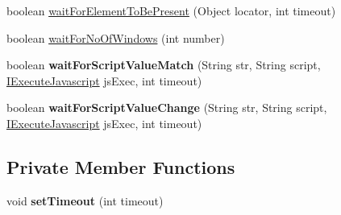 \begin{DoxyCompactItemize}
\item 
boolean \hyperlink{classcom_1_1zeuslearning_1_1automation_1_1selenium_1_1interactions_1_1FluentTimeout_afce3a66e8c4bab59f37be96fd45eeec3}{wait\+For\+Element\+To\+Be\+Present} (Object locator, int timeout)
\item 
boolean \hyperlink{classcom_1_1zeuslearning_1_1automation_1_1selenium_1_1interactions_1_1FluentTimeout_a9d12d8da29ae600e1955e244a79f2ec0}{wait\+For\+No\+Of\+Windows} (int number)
\item 
\hypertarget{classcom_1_1zeuslearning_1_1automation_1_1selenium_1_1interactions_1_1FluentTimeout_ac99f8a5abae929e954664469b8ebdc2d}{}\label{classcom_1_1zeuslearning_1_1automation_1_1selenium_1_1interactions_1_1FluentTimeout_ac99f8a5abae929e954664469b8ebdc2d} 
boolean {\bfseries wait\+For\+Script\+Value\+Match} (String str, String script, \hyperlink{interfacecom_1_1zeuslearning_1_1automation_1_1interactions_1_1IExecuteJavascript}{I\+Execute\+Javascript} js\+Exec, int timeout)
\item 
\hypertarget{classcom_1_1zeuslearning_1_1automation_1_1selenium_1_1interactions_1_1FluentTimeout_ad0e3b0ba98564780c3f3ba0559818e46}{}\label{classcom_1_1zeuslearning_1_1automation_1_1selenium_1_1interactions_1_1FluentTimeout_ad0e3b0ba98564780c3f3ba0559818e46} 
boolean {\bfseries wait\+For\+Script\+Value\+Change} (String str, String script, \hyperlink{interfacecom_1_1zeuslearning_1_1automation_1_1interactions_1_1IExecuteJavascript}{I\+Execute\+Javascript} js\+Exec, int timeout)
\end{DoxyCompactItemize}
\subsection*{Private Member Functions}
\begin{DoxyCompactItemize}
\item 
\hypertarget{classcom_1_1zeuslearning_1_1automation_1_1selenium_1_1interactions_1_1FluentTimeout_aa4f482171c1747bb03419a9ba851d3a0}{}\label{classcom_1_1zeuslearning_1_1automation_1_1selenium_1_1interactions_1_1FluentTimeout_aa4f482171c1747bb03419a9ba851d3a0} 
void {\bfseries set\+Timeout} (int timeout)
\end{DoxyCompactItemize}
